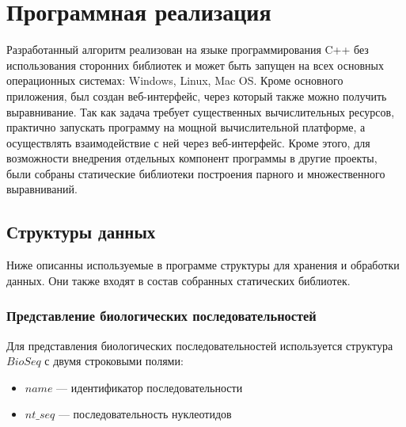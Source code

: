 \newpage

\section[Программная реализация]{\large \centering Программная реализация}
\hspace{\parindent} Разработанный алгоритм реализован на языке программирования C++ без использования сторонних библиотек и может быть запущен на всех основных операционных системах: Windows, Linux, Mac OS. Кроме основного приложения, был создан веб-интерфейс, через который также можно получить выравнивание. Так как задача требует существенных вычислительных ресурсов, практично запускать программу на мощной вычислительной платформе, а осуществлять взаимодействие с ней через веб-интерфейс. Кроме этого, для возможности внедрения отдельных компонент программы в другие проекты, были собраны статические библиотеки построения парного и множественного выравниваний.

\subsection[Структуры данных]{\large Структуры данных}
\hspace{\parindent} Ниже описанны используемые в программе структуры для хранения и обработки данных. Они также входят в состав собранных статических библиотек.

\subsubsection[Представление биологических последовательностей]{\large Представление биологических последовательностей}
\hspace{\parindent} Для представления биологических последовательностей используется структура $BioSeq$ с двумя строковыми полями:
\begin{itemize}
	\item $name$ --- идентификатор последовательности
	\item $nt\_seq$ --- последовательность нуклеотидов
\end{itemize}

